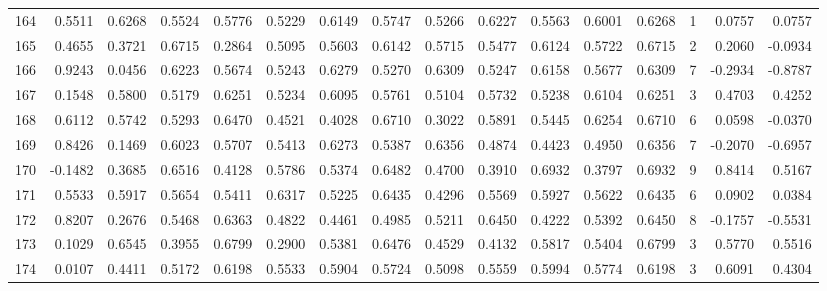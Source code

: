 \begin{tabular}{lrrrrrrrrrrrrrrr}
164 &      0.5511 &  0.6268 &  0.5524 &  0.5776 &  0.5229 &  0.6149 &  0.5747 &  0.5266 &  0.6227 &  0.5563 &   0.6001 &     0.6268 &      1 &                    0.0757 &                     0.0757 \\
165 &      0.4655 &  0.3721 &  0.6715 &  0.2864 &  0.5095 &  0.5603 &  0.6142 &  0.5715 &  0.5477 &  0.6124 &   0.5722 &     0.6715 &      2 &                    0.2060 &                    -0.0934 \\
166 &      0.9243 &  0.0456 &  0.6223 &  0.5674 &  0.5243 &  0.6279 &  0.5270 &  0.6309 &  0.5247 &  0.6158 &   0.5677 &     0.6309 &      7 &                   -0.2934 &                    -0.8787 \\
167 &      0.1548 &  0.5800 &  0.5179 &  0.6251 &  0.5234 &  0.6095 &  0.5761 &  0.5104 &  0.5732 &  0.5238 &   0.6104 &     0.6251 &      3 &                    0.4703 &                     0.4252 \\
168 &      0.6112 &  0.5742 &  0.5293 &  0.6470 &  0.4521 &  0.4028 &  0.6710 &  0.3022 &  0.5891 &  0.5445 &   0.6254 &     0.6710 &      6 &                    0.0598 &                    -0.0370 \\
169 &      0.8426 &  0.1469 &  0.6023 &  0.5707 &  0.5413 &  0.6273 &  0.5387 &  0.6356 &  0.4874 &  0.4423 &   0.4950 &     0.6356 &      7 &                   -0.2070 &                    -0.6957 \\
170 &     -0.1482 &  0.3685 &  0.6516 &  0.4128 &  0.5786 &  0.5374 &  0.6482 &  0.4700 &  0.3910 &  0.6932 &   0.3797 &     0.6932 &      9 &                    0.8414 &                     0.5167 \\
171 &      0.5533 &  0.5917 &  0.5654 &  0.5411 &  0.6317 &  0.5225 &  0.6435 &  0.4296 &  0.5569 &  0.5927 &   0.5622 &     0.6435 &      6 &                    0.0902 &                     0.0384 \\
172 &      0.8207 &  0.2676 &  0.5468 &  0.6363 &  0.4822 &  0.4461 &  0.4985 &  0.5211 &  0.6450 &  0.4222 &   0.5392 &     0.6450 &      8 &                   -0.1757 &                    -0.5531 \\
173 &      0.1029 &  0.6545 &  0.3955 &  0.6799 &  0.2900 &  0.5381 &  0.6476 &  0.4529 &  0.4132 &  0.5817 &   0.5404 &     0.6799 &      3 &                    0.5770 &                     0.5516 \\
174 &      0.0107 &  0.4411 &  0.5172 &  0.6198 &  0.5533 &  0.5904 &  0.5724 &  0.5098 &  0.5559 &  0.5994 &   0.5774 &     0.6198 &      3 &                    0.6091 &                     0.4304 \\

\end{tabular}
